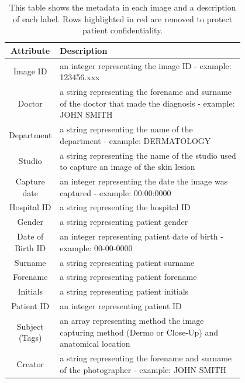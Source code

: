 \begin{table}
    \small
    \begin{tabular}{|c|p{0.8\linewidth}|}
    \hline
        Attribute & Description
        \\
        \hline
        Image ID & an integer representing the image ID - example: 123456.xxx
        \\
        \hline
        \rowcolor{Red}
        Doctor & a string representing the forename and surname of the doctor that made the diagnosis - example: JOHN SMITH
        \\
        \hline
        \rowcolor{Red}
        Department & a string representing the name of the department - example: DERMATOLOGY
        \\
        \hline
        \rowcolor{Red}
        Studio & a string representing the name of the studio used to capture an image of the skin lesion
        \\
        \hline
        Capture date & an integer representing the date the image was captured - example: 00:00:0000
        \\
        \hline
        \rowcolor{Red}
        Hospital ID & a string representing the hospital ID
        \\
        \hline
        Gender & a string representing patient gender
        \\
        \hline
        Date of Birth ID & an integer representing patient date of birth - example: 00-00-0000
        \\
        \hline
        \rowcolor{Red}
        Surname & a string representing patient surname
        \\
        \hline
        \rowcolor{Red}
        Forename & a string representing patient forename
        \\
        \hline
        \rowcolor{Red}
        Initials & a string representing patient initials
        \\
        \hline
        \rowcolor{Red}
        Patient ID & an integer representing patient ID
        \\
        \hline
        Subject (Tags) & an array representing method the image capturing method (Dermo or Close-Up) and anatomical location
        \\
        \hline
        \rowcolor{Red}
        Creator & a string representing the forename and surname of the photographer - example: JOHN SMITH
        \\
        \hline

    \end{tabular}
    \caption{This table shows the metadata in each image and a description of each label. Rows highlighted in red are removed to protect patient confidentiality.}
\end{table}\label{nhs-metadata}                         

